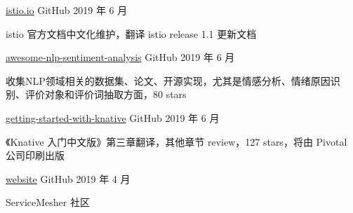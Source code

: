 

\begin{cventries}

  \cventry
    {} %
    {\href{https://github.com/istio/istio.io}{istio.io}} %
    {GitHub} %
    {2019 年 6 月} %
    {
      \begin{cvitems} %
        \item istio 官方文档中文化维护，翻译 istio release 1.1 更新文档
      \end{cvitems}
    }

  \cventry
    {} %
    {\href{haiker2011/awesome-nlp-sentiment-analysis}{awesome-nlp-sentiment-analysis}} %
    {GitHub} %
    {2019 年 6 月} %
    {
      \begin{cvitems} %
        \item 收集NLP领域相关的数据集、论文、开源实现，尤其是情感分析、情绪原因识别、评价对象和评价词抽取方面，80 stars
      \end{cvitems}
    }

  \cventry
    {} %
    {\href{https://github.com/servicemesher/getting-started-with-knative}{getting-started-with-knative}} %
    {GitHub} %
    {2019 年 6 月} %
    {
      \begin{cvitems} %
        \item 《Knative 入门中文版》第三章翻译，其他章节 review，127 stars，将由 Pivotal 公司印刷出版
      \end{cvitems}
    }

  \cventry
    {} %
    {\href{https://github.com/servicemesher/website}{website}} %
    {GitHub} %
    {2019 年 4 月} %
    {
      \begin{cvitems} %
        \item ServiceMesher 社区
      \end{cvitems}
    }



\end{cventries}
